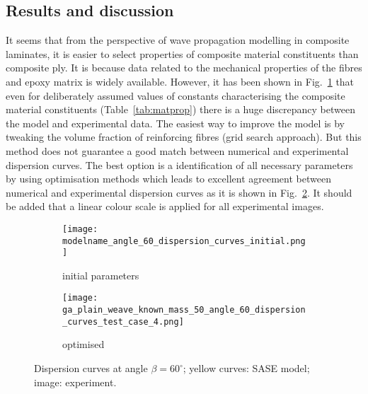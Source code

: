 \documentclass[preprint,12pt]{elsarticle}
\begin{document}
	\subsection{Results and discussion}
It seems that from the perspective of wave propagation modelling in composite laminates, it is easier to select properties of composite material constituents than composite ply. It is because data related to the mechanical properties of the fibres and epoxy matrix is widely available. However, it has been shown in Fig.~\ref{fig:dispersion60deg_initial} that even for deliberately assumed values of constants characterising the composite material constituents (Table~\ref{tab:matprop}) there is a huge discrepancy between the model and experimental data. The easiest way to improve the model is by tweaking the volume fraction of reinforcing fibres (grid search approach). But this method does not guarantee a good match between numerical and experimental dispersion curves. The best option is a identification of all necessary parameters by using optimisation methods which leads to excellent agreement between numerical and experimental dispersion curves as it is shown in Fig.~\ref{fig:dispersion60deg}. It should be added that a linear colour scale is applied for all experimental images.
	\begin{figure} [h!]
		\newcommand{\modelname}{ga_plain_weave_known_mass}
		\centering
		\begin{subfigure}[b]{0.49\textwidth}
			\centering
		   \texttt{[image: \\modelname\_angle\_60\_dispersion\_curves\_initial.png]}
			\caption{initial parameters}
			\label{fig:dispersion60deg_initial}
		\end{subfigure}
		\begin{subfigure}[b]{0.49\textwidth}
			\centering
			\texttt{[image: ga\_plain\_weave\_known\_mass\_50\_angle\_60\_dispersion\_curves\_test\_case\_4.png]}
			\caption{optimised}
			\label{fig:dispersion60deg}
		\end{subfigure}
	\caption{Dispersion curves at angle $\beta = 60^{\circ}$; yellow curves: SASE model; image: experiment. }
	\label{fig:initial_optimized}
	\end{figure}
\end{document}
